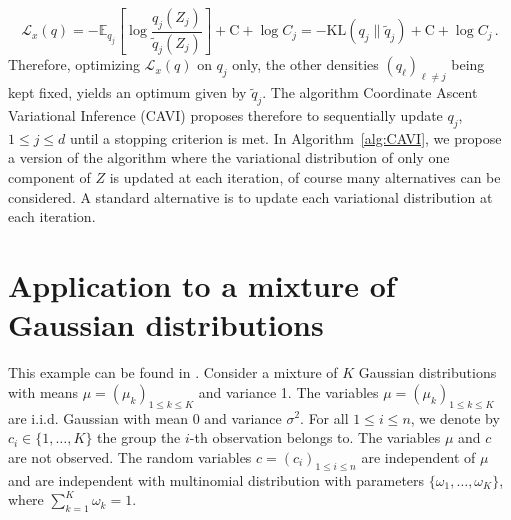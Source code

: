 \documentclass[english,graybox,envcountchap,envcountsame,sectrefs,shortlabels]{svmono}
\theoremstyle{style}
\begin{document}
$$
\mathcal{L}_x(q) = -\mathbb{E}_{q_j}\left[\log \frac{q_j(Z_j)}{\tilde q_j(Z_j) }\right]  + \mathrm{C} + \log C_j = -\mathrm{KL}(q_j\|\tilde q_j)  + \mathrm{C} + \log C_j\,.
$$
Therefore, optimizing  $\mathcal{L}_x(q) $ on $q_j$ only, the other densities $(q_\ell)_{\ell\neq j}$ being kept fixed, yields an optimum given by $\tilde q_j$.
The algorithm Coordinate Ascent Variational Inference (CAVI) proposes therefore to sequentially update  $q_j$, $1\leq j \leq d$ until a stopping criterion is met. In Algorithm~\ref{alg:CAVI}, we propose a version of the algorithm where the variational distribution of only one component of $Z$ is updated at each iteration, of course many alternatives can be considered. A standard alternative is to update each variational distribution at each iteration.

\begin{algorithm}[H] \label{alg:CAVI}
\end{algorithm}

\section{Application to a mixture of Gaussian distributions}
This example can be found in  \cite{blei2017variational}. Consider a mixture of $K$ Gaussian distributions with means $\mu = (\mu_k)_{1\leqslant k \leqslant K}$ and variance 1. The variables  $\mu = (\mu_k)_{1\leqslant k \leqslant K}$ are  i.i.d. Gaussian with mean 0 and variance $\sigma^2$. For all $1\leq i\leq n$, we denote by $c_i\in\{1, \ldots, K\}$ the group the $i$-th observation belongs to. The variables $\mu$ and $c$ are not observed.  The random variables $c= (c_i)_{1\leq i\leq n}$ are independent of  $\mu$ and are independent with multinomial distribution with parameters $\{\omega_1,\ldots,\omega_K\}$, where $\sum_{k=1}^K\omega_k = 1$.  
\end{document}
